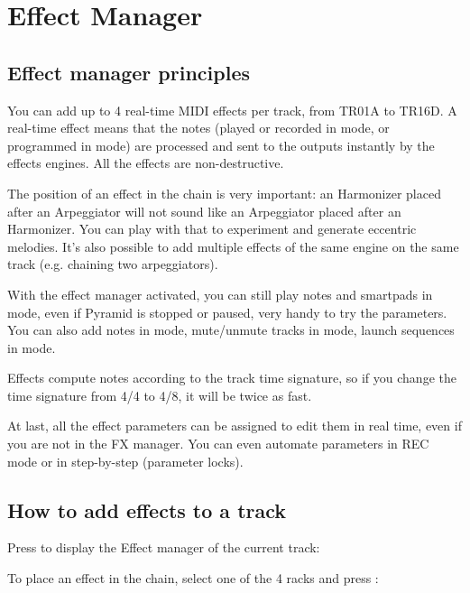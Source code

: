 \chapter{Effect Manager}

\section{Effect manager principles}

You can add up to 4 real-time MIDI effects per track, from TR01A to TR16D. A real-time effect means that the notes (played or recorded in  mode, or programmed in  mode) are processed and sent to the outputs instantly by the effects engines. All the effects are non-destructive.

The position of an effect in the chain is very important: an Harmonizer placed after an Arpeggiator will not sound like an Arpeggiator placed after an Harmonizer. You can play with that to experiment and generate eccentric melodies. It's also possible to add multiple effects of the same engine on the same track (e.g. chaining two arpeggiators).


With the effect manager activated, you can still play notes and smartpads in  mode, even if Pyramid is stopped or paused, very handy to try the parameters. You can also add notes in  mode, mute/unmute tracks in  mode, launch sequences in  mode.

Effects compute notes according to the track time signature, so if you change the time signature from 4/4 to 4/8, it will be twice as fast.

At last, all the effect parameters can be assigned to edit them in real time, even if you are not in the FX manager. You can even automate parameters in REC mode or in step-by-step (parameter locks).


\section{How to add effects to a track}

Press  to display the Effect manager of the current track:


To place an effect in the chain, select one of the 4 racks and press \encodericon{}:


